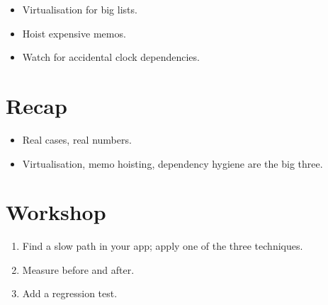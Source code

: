\begin{itemize}[leftmargin=*]
  \item Virtualisation for big lists.
  \item Hoist expensive memos.
  \item Watch for accidental clock dependencies.
\end{itemize}

\section{Recap}

\begin{recap}
\begin{itemize}[leftmargin=*]
  \item Real cases, real numbers.
  \item Virtualisation, memo hoisting, dependency hygiene
    are the big three.
\end{itemize}
\end{recap}

\section*{Workshop}

\begin{enumerate}[leftmargin=*]
  \item Find a slow path in your app; apply one of the
    three techniques.
  \item Measure before and after.
  \item Add a regression test.
\end{enumerate}
